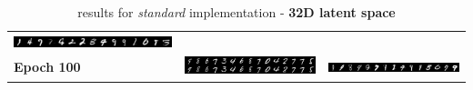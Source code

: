\documentclass[10pt,a4paper]{article}
\begin{document}
\begin{table}
\begin{tabular}{p{}p{}p{}}
{      \includegraphics[width=1.3\linewidth]{images/l_32_bce/generated49.png}}\\
      \textbf{Epoch 100} & \parbox[c]{10em}{
      \hfill\includegraphics[width=1.3\linewidth]{images/l_32_bce/output99.png}} & \parbox[c]{10em}{
      \includegraphics[width=1.3\linewidth]{images/l_32_bce/generated99.png}}\\
      \hline
  \end{tabular}
  \caption{results for \textit{standard} implementation - \textbf{32D latent space}} \label{tab:bce32d}
\end{table}
\end{document}
